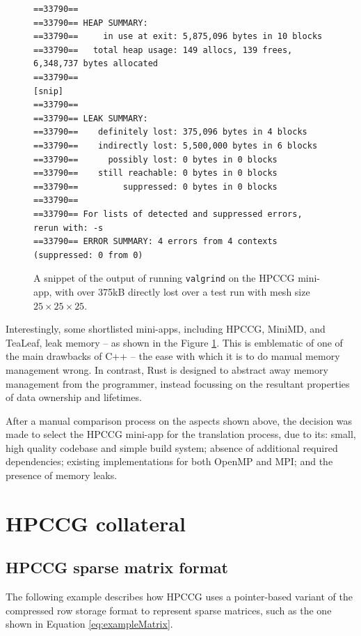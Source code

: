 \begin{figure}[H]
\begin{verbatim}
==33790== 
==33790== HEAP SUMMARY:
==33790==     in use at exit: 5,875,096 bytes in 10 blocks
==33790==   total heap usage: 149 allocs, 139 frees, 6,348,737 bytes allocated
==33790== 
[snip]
==33790== 
==33790== LEAK SUMMARY:
==33790==    definitely lost: 375,096 bytes in 4 blocks
==33790==    indirectly lost: 5,500,000 bytes in 6 blocks
==33790==      possibly lost: 0 bytes in 0 blocks
==33790==    still reachable: 0 bytes in 0 blocks
==33790==         suppressed: 0 bytes in 0 blocks
==33790== 
==33790== For lists of detected and suppressed errors, rerun with: -s
==33790== ERROR SUMMARY: 4 errors from 4 contexts (suppressed: 0 from 0)
\end{verbatim}
    \caption{A snippet of the output of running \texttt{valgrind} on the HPCCG mini-app, with over 375kB directly lost over a test run with mesh size $25 \times 25 \times 25$.}
    \label{fig:minimdValgrindOutput}
\end{figure}

Interestingly, some shortlisted mini-apps, including HPCCG, MiniMD, and TeaLeaf, leak memory -- as shown in the Figure \ref{fig:minimdValgrindOutput}. This is emblematic of one of the main drawbacks of C++ -- the ease with which it is to do manual memory management wrong. In contrast, Rust is designed to abstract away memory management from the programmer, instead focussing on the resultant properties of data ownership and lifetimes.

After a manual comparison process on the aspects shown above, the decision was made to select the HPCCG mini-app for the translation process, due to its: small, high quality codebase and simple build system; absence of additional required dependencies; existing implementations for both OpenMP and MPI; and the presence of memory leaks.



\chapter{HPCCG collateral}
\label{ch:hpccg-appendix}

\section{HPCCG sparse matrix format}
\label{sec:hpccg-sparse-matrix-appendix}

The following example describes how HPCCG uses a pointer-based variant of the compressed row storage format to represent sparse matrices, such as the one shown in Equation \ref{eq:exampleMatrix}.

